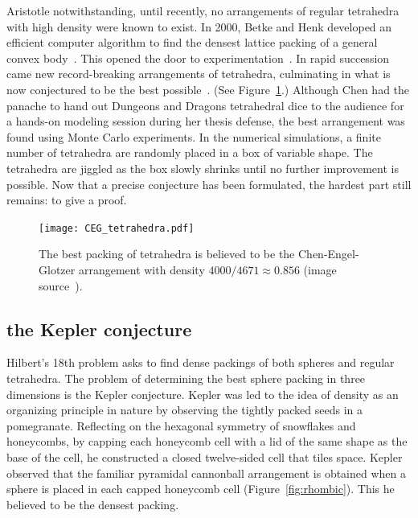 \documentclass{llncs}
\begin{document}
Aristotle notwithstanding, until recently, no arrangements of regular
tetrahedra with high density were known to exist.  In 2000, Betke and
Henk developed an efficient computer algorithm to find the densest
lattice packing of a general convex body~\cite{BH2000}.  This opened
the door to experimentation~\cite{Conway-2006}.  In rapid succession
came new record-breaking arrangements of tetrahedra, culminating in
what is now conjectured to be the best possible~\cite{Chen-2010}.
(See Figure~\ref{fig:CEG}.)  Although Chen had the panache to hand out
Dungeons and Dragons tetrahedral dice to the audience for a hands-on
modeling session during her thesis defense, the best arrangement was
found using Monte Carlo experiments.  In the numerical simulations, a
finite number of tetrahedra are randomly placed in a box of variable
shape.  The tetrahedra are jiggled as the box slowly shrinks until
no further improvement is possible.  Now that a precise conjecture has
been formulated, the hardest part still remains: to give a proof.

\begin{figure}[h!]
  \centering
\texttt{[image: CEG\_tetrahedra.pdf]}
  \caption{The best packing of
tetrahedra is believed to be the Chen-Engel-Glotzer arrangement with density
$4000/4671\approx 0.856$ (image source~\cite{Chen-2010}).}
\label{fig:CEG}
\end{figure}


\subsection{the Kepler conjecture}

% 


Hilbert's 18th problem asks to find dense packings of both spheres and
regular tetrahedra.  The problem of determining the best sphere
packing in three dimensions is the Kepler conjecture.  Kepler was led
to the idea of density as an organizing principle in nature by
observing the tightly packed seeds in a pomegranate.  Reflecting on
the hexagonal symmetry of snowflakes and honeycombs, by capping each
honeycomb cell with a lid of the same shape as the base of the cell,
he constructed a closed twelve-sided cell that tiles space.  Kepler
observed that the familiar pyramidal cannonball arrangement is
obtained when a sphere is placed in each capped honeycomb cell
(Figure~\ref{fig:rhombic}).  This he believed to be the densest
packing.
\end{document}
